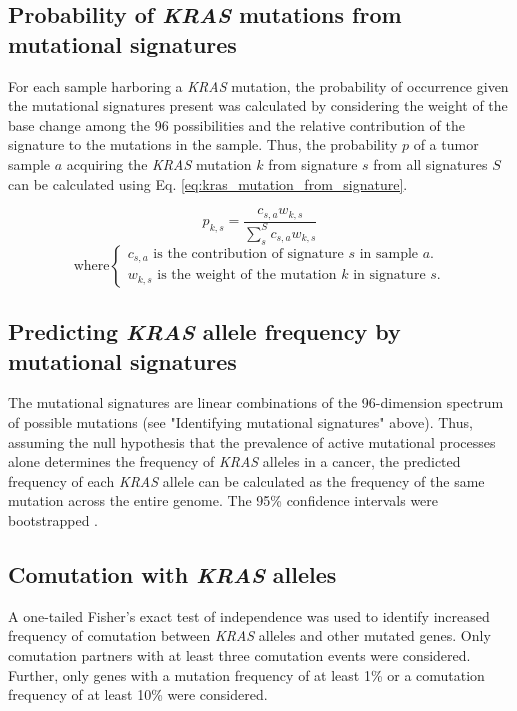 \documentclass[english, 10pt, letterpaper]{article}
\newcommand{\KRAS}{\emph{KRAS}}
\begin{document}
\subsection*{Probability of \KRAS{} mutations from mutational signatures}

For each sample harboring a \KRAS{} mutation, the probability of occurrence given the mutational signatures present was calculated by considering the weight of the base change among the 96 possibilities and the relative contribution of the signature to the mutations in the sample. 
Thus, the probability $p$ of a tumor sample $a$ acquiring the \KRAS{} mutation $k$ from signature $s$ from all signatures $S$ can be calculated using Eq. \ref{eq:kras_mutation_from_signature}.

\begin{equation}
\label{eq:kras_mutation_from_signature}
p_{k,s} = \frac{c_{s,a} w_{k,s}}{\sum_{s}^{S} c_{s,a} w_{k,s}}
\end{equation}
\begin{equation*}
    \text{where} 
    \begin{cases}
        c_{s,a} \text{ is the contribution of signature $s$ in sample $a$.} \\
        w_{k,s} \text{ is the weight of the mutation $k$ in signature $s$.}
    \end{cases}
\end{equation*}


\subsection*{Predicting \KRAS{} allele frequency by mutational signatures}

The mutational signatures are linear combinations of the 96-dimension spectrum of possible mutations (see "Identifying mutational signatures" above).
Thus, assuming the null hypothesis that the prevalence of active mutational processes alone determines the frequency of \KRAS{} alleles in a cancer, the predicted frequency of each \KRAS{} allele can be calculated as the frequency of the same mutation across the entire genome.
The 95\% confidence intervals were bootstrapped \cite{R-boot}.


\subsection*{Comutation with \KRAS{} alleles}

A one-tailed Fisher’s exact test of independence was used to identify increased frequency of comutation between \KRAS{} alleles and other mutated genes. Only comutation partners with at least three comutation events were considered. Further, only genes with a mutation frequency of at least 1\% or a comutation frequency of at least 10\% were considered. 
\end{document}
